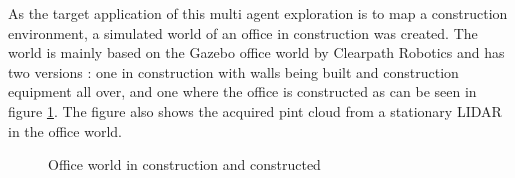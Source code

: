 \documentclass[12pt]{article}
\begin{document}
    As the target application of this multi agent exploration is to map a construction environment, a simulated world of an office in construction was created. The world is mainly based on the Gazebo office world by Clearpath Robotics and has two versions : one in construction with walls being built and construction equipment all over, and one where the office is constructed as can be seen in figure \ref{fig:office_world}. The figure also shows the acquired pint cloud from a stationary LIDAR in the office world. 

    \begin{figure}[H]
        \centering
        \caption{Office world in construction and constructed}
        \label{fig:office_world}
    \end{figure}
\end{document}
